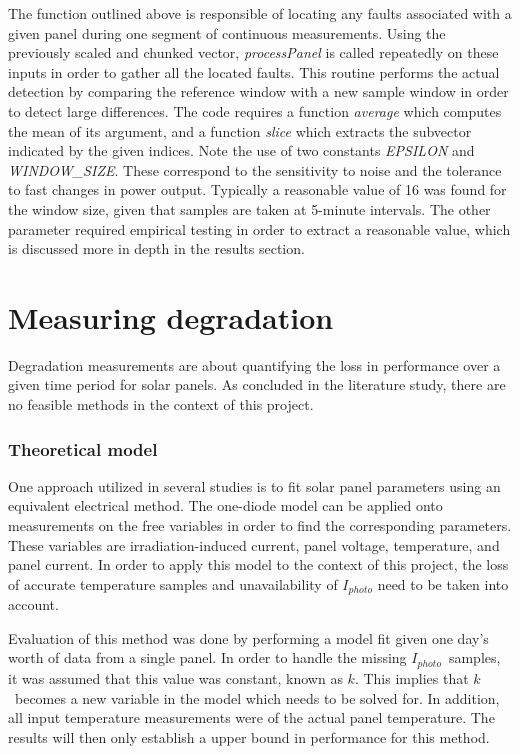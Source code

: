 The function outlined above is responsible of locating any faults associated with a given panel during one segment of continuous measurements.
Using the previously scaled and chunked vector, \emph{processPanel} is called repeatedly on these inputs in order to gather all the located faults.
This routine performs the actual detection by comparing the reference window with a new sample window in order to detect large differences.
The code requires a function \emph{average} which computes the mean of its argument, and a function \emph{slice} which extracts the subvector indicated by the given indices.
Note the use of two constants \emph{EPSILON} and \emph{WINDOW\_SIZE}.
These correspond to the sensitivity to noise and the tolerance to fast changes in power output.
Typically a reasonable value of 16 was found for the window size, given that samples are taken at 5-minute intervals.
The other parameter required empirical testing in order to extract a reasonable value, which is discussed more in depth in the results section.

\newpage
\section{Measuring degradation}
Degradation measurements are about quantifying the loss in performance over a given time period for solar panels.
As concluded in the literature study, there are no feasible methods in the context of this project.

\subsubsection{Theoretical model}
One approach utilized in several studies is to fit solar panel parameters using an equivalent electrical method.
The one-diode model can be applied onto measurements on the free variables in order to find the corresponding parameters.
These variables are irradiation-induced current, panel voltage, temperature, and panel current.
In order to apply this model to the context of this project, the loss of accurate temperature samples and unavailability of
$I_{photo}$ need to be taken into account.

Evaluation of this method was done by performing a model fit given one day's worth of data from a single panel.
In order to handle the missing $I_{photo}$ samples, it was assumed that this value was constant, known as $k$.
This implies that $k$ becomes a new variable in the model which needs to be solved for.
In addition, all input temperature measurements were of the actual panel temperature.
The results will then only establish a upper bound in performance for this method.

